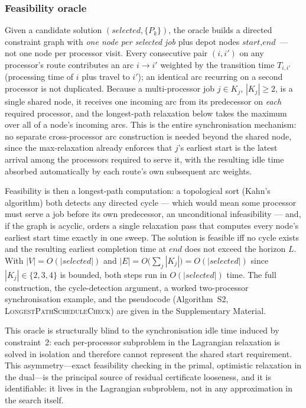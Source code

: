 \documentclass[preprint,12pt]{elsarticle}
\begin{document}
\subsubsection*{Feasibility oracle}

Given a candidate solution $(\textit{selected}, \{P_k\})$, the oracle builds a directed constraint graph with \emph{one node per selected job} plus depot nodes $\textit{start}, \textit{end}$ --- not one node per processor visit. Every consecutive pair $(i,i')$ on any processor's route contributes an arc $i\to i'$ weighted by the transition time $T_{i,i'}$ (processing time of $i$ plus travel to $i'$); an identical arc recurring on a second processor is not duplicated. Because a multi-processor job $j\in K_j$, $|K_j|\ge2$, is a single shared node, it receives one incoming arc from its predecessor on \emph{each} required processor, and the longest-path relaxation below takes the maximum over all of a node's incoming arcs. This is the entire synchronisation mechanism: no separate cross-processor arc construction is needed beyond the shared node, since the max-relaxation already enforces that $j$'s earliest start is the latest arrival among the processors required to serve it, with the resulting idle time absorbed automatically by each route's own subsequent arc weights.

Feasibility is then a longest-path computation: a topological sort (Kahn's algorithm) both detects any directed cycle --- which would mean some processor must serve a job before its own predecessor, an unconditional infeasibility --- and, if the graph is acyclic, orders a single relaxation pass that computes every node's earliest start time exactly in one sweep. The solution is feasible iff no cycle exists and the resulting earliest completion time at $\textit{end}$ does not exceed the horizon $L$. With $|V|=O(|\textit{selected}|)$ and $|E|=O\bigl(\sum_j|K_j|\bigr)=O(|\textit{selected}|)$ since $|K_j|\in\{2,3,4\}$ is bounded, both steps run in $O(|\textit{selected}|)$ time. The full construction, the cycle-detection argument, a worked two-processor synchronisation example, and the pseudocode (Algorithm~S2, \textsc{LongestPathScheduleCheck}) are given in the Supplementary Material.

This oracle is structurally blind to the synchronisation idle time induced by constraint~2: each per-processor subproblem in the Lagrangian relaxation is solved in isolation and therefore cannot represent the shared start requirement. This asymmetry---exact feasibility checking in the primal, optimistic relaxation in the dual---is the principal source of residual certificate looseness, and it is identifiable: it lives in the Lagrangian subproblem, not in any approximation in the search itself.
\end{document}
